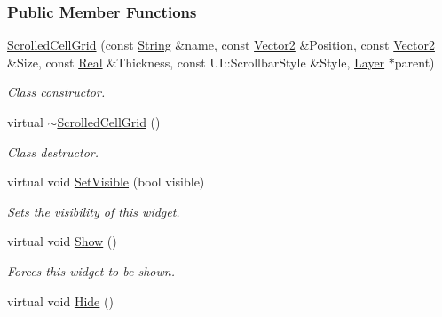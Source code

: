 \subsubsection*{Public Member Functions}
\begin{DoxyCompactItemize}
\item 
\hyperlink{classphys_1_1UI_1_1ScrolledCellGrid_ac5c8216540515fef2d30ddd075ccb941}{ScrolledCellGrid} (const \hyperlink{namespacephys_aa03900411993de7fbfec4789bc1d392e}{String} \&name, const \hyperlink{classphys_1_1Vector2}{Vector2} \&Position, const \hyperlink{classphys_1_1Vector2}{Vector2} \&Size, const \hyperlink{namespacephys_af7eb897198d265b8e868f45240230d5f}{Real} \&Thickness, const UI::ScrollbarStyle \&Style, \hyperlink{classphys_1_1UI_1_1Layer}{Layer} $\ast$parent)
\begin{DoxyCompactList}\small\item\em Class constructor. \item\end{DoxyCompactList}\item 
\hypertarget{classphys_1_1UI_1_1ScrolledCellGrid_a27a91d4fe26c101718f8593c8775f0cb}{
virtual \hyperlink{classphys_1_1UI_1_1ScrolledCellGrid_a27a91d4fe26c101718f8593c8775f0cb}{$\sim$ScrolledCellGrid} ()}
\label{classphys_1_1UI_1_1ScrolledCellGrid_a27a91d4fe26c101718f8593c8775f0cb}

\begin{DoxyCompactList}\small\item\em Class destructor. \item\end{DoxyCompactList}\item 
virtual void \hyperlink{classphys_1_1UI_1_1ScrolledCellGrid_aef5b78f205e75d33fff05623a1b61aa4}{SetVisible} (bool visible)
\begin{DoxyCompactList}\small\item\em Sets the visibility of this widget. \item\end{DoxyCompactList}\item 
virtual void \hyperlink{classphys_1_1UI_1_1ScrolledCellGrid_af75c87ada3a1bac3dda208485ebc5f94}{Show} ()
\begin{DoxyCompactList}\small\item\em Forces this widget to be shown. \item\end{DoxyCompactList}\item 
\hypertarget{classphys_1_1UI_1_1ScrolledCellGrid_a489a88ad115f0059dabb4519f6139bd8}{
virtual void \hyperlink{classphys_1_1UI_1_1ScrolledCellGrid_a489a88ad115f0059dabb4519f6139bd8}{Hide} ()}
\label{classphys_1_1UI_1_1ScrolledCellGrid_a489a88ad115f0059dabb4519f6139bd8}


\end{DoxyCompactItemize}
